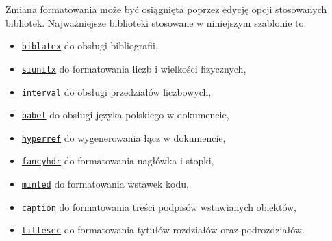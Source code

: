Zmiana formatowania może być osiągnięta poprzez edycję opcji stosowanych bibliotek. Najważniejsze biblioteki stosowane w niniejszym szablonie to:
\begin{itemize}
\item \texttt{\href{https://ctan.org/pkg/biblatex}{biblatex}} do obsługi bibliografii,
\item \texttt{\href{https://ctan.org/pkg/siunitx}{siunitx}} do formatowania liczb i wielkości fizycznych,
\item \texttt{\href{https://ctan.org/pkg/interval}{interval}} do obsługi przedziałów liczbowych,
\item \texttt{\href{https://ctan.org/pkg/babel-polish}{babel}} do obsługi języka polskiego w dokumencie,
\item \texttt{\href{https://ctan.org/pkg/hyperref}{hyperref}} do wygenerowania łącz w dokumencie,
\item \texttt{\href{https://ctan.org/pkg/hyperref}{fancyhdr}} do formatowania nagłówka i stopki,
\item \texttt{\href{https://ctan.org/pkg/minted}{minted}} do formatowania wstawek kodu,
\item \texttt{\href{https://ctan.org/pkg/caption}{caption}} do formatowania treści podpisów wstawianych obiektów,
\item \texttt{\href{https://ctan.org/pkg/titlesec}{titlesec}} do formatowania tytułów rozdziałów oraz podrozdziałów.
\end{itemize}
